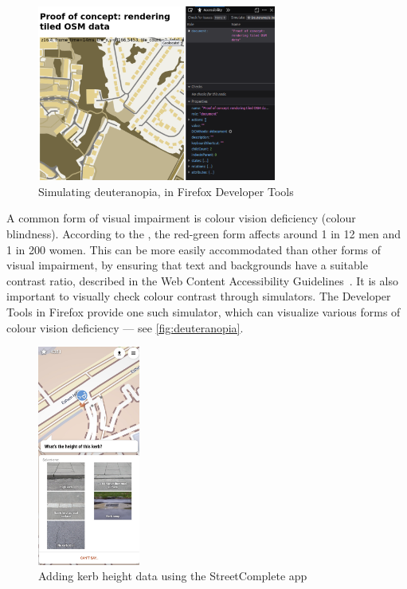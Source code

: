 \documentclass[hyphens]{final_report}
\begin{document}
\begin{figure}[ht]
    \centering
    \includegraphics[width=0.7\textwidth]{images/simulated-deuteranopia.png}
    \caption{Simulating deuteranopia, in Firefox Developer Tools}\label{fig:deuteranopia}
\end{figure}

A common form of visual impairment is colour vision deficiency (colour blindness). According to the \textcite{nhs-colour-vision-deficiency}, the red-green form affects around 1 in 12 men and 1 in 200 women. This can be more easily accommodated than other forms of visual impairment, by ensuring that text and backgrounds have a suitable contrast ratio, described in the Web Content Accessibility Guidelines~\cite{w3c-wcag}. It is also important to visually check colour contrast through simulators. The Developer Tools in Firefox provide one such simulator, which can visualize various forms of colour vision deficiency --- see \autoref{fig:deuteranopia}.

\begin{figure}[ht]
    \centering
    \includegraphics[width=0.3\textwidth]{images/street-complete-kerb.jpg}
    \caption{Adding kerb height data using the StreetComplete app}\label{fig:sc-kerb}
\end{figure}
\end{document}
